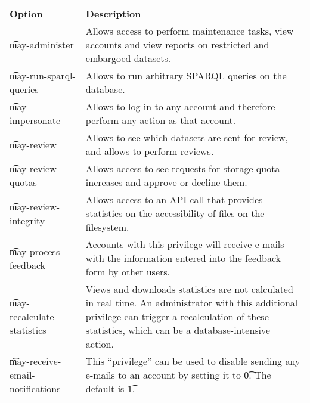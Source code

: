 \begin{tabularx}{\textwidth}{*{1}{!{\VRule[-1pt]}l}!{\VRule[-1pt]}X}
  \headrow
  \textbf{Option}                     & \textbf{Description}\\
  \t{may-administer}                  & Allows access to perform maintenance
                                        tasks, view accounts and view reports
                                        on restricted and embargoed datasets.\\
  \t{may-run-sparql-queries}          & Allows to run arbitrary SPARQL queries
                                        on the database.\\
  \t{may-impersonate}                 & Allows to log in to any account and
                                        therefore perform any action as that
                                        account.\\
  \t{may-review}                      & Allows to see which datasets are sent
                                        for review, and allows to perform
                                        reviews.\\
  \t{may-review-quotas}               & Allows access to see requests for
                                        storage quota increases and approve or
                                        decline them.\\
  \t{may-review-integrity}            & Allows access to an API call that
                                        provides statistics on the accessibility
                                        of files on the filesystem.\\
  \t{may-process-feedback}            & Accounts with this privilege will
                                        receive e-mails with the information
                                        entered into the feedback form by other
                                        users.\\
  \t{may-recalculate-statistics}      & Views and downloads statistics are not
                                        calculated in real time.  An administrator
                                        with this additional privilege can trigger
                                        a recalculation of these statistics, which
                                        can be a database-intensive action.\\
  \t{may-receive-email-notifications} & This ``privilege'' can be used to disable
                                        sending any e-mails to an account by
                                        setting it to \t{0}.  The default is
                                        \t{1}.
\end{tabularx}

